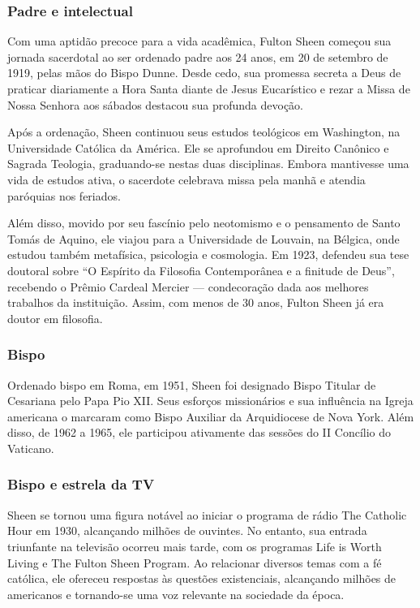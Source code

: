 \documentclass[11pt]{article}
\begin{document}
\begin{justify}
\subsubsection{Padre e intelectual}

Com uma aptidão precoce para a vida acadêmica, Fulton Sheen começou sua jornada sacerdotal ao ser ordenado padre aos 24 anos, em 20 de setembro de 1919, pelas mãos do Bispo Dunne. Desde cedo, sua promessa secreta a Deus de praticar diariamente a Hora Santa diante de Jesus Eucarístico e rezar a Missa de Nossa Senhora aos sábados destacou sua profunda devoção.

Após a ordenação, Sheen continuou seus estudos teológicos em Washington, na Universidade Católica da América. Ele se aprofundou em Direito Canônico e Sagrada Teologia, graduando-se nestas duas disciplinas. Embora mantivesse uma vida de estudos ativa, o sacerdote celebrava missa pela manhã e atendia paróquias nos feriados.

Além disso, movido por seu fascínio pelo neotomismo e o pensamento de Santo Tomás de Aquino, ele viajou para a Universidade de Louvain, na Bélgica, onde estudou também metafísica, psicologia e cosmologia. Em 1923, defendeu sua tese doutoral sobre “O Espírito da Filosofia Contemporânea e a finitude de Deus”, recebendo o Prêmio Cardeal Mercier — condecoração dada aos melhores trabalhos da instituição. Assim, com menos de 30 anos, Fulton Sheen já era doutor em filosofia.

\subsubsection{Bispo}

Ordenado bispo em Roma, em 1951, Sheen foi designado Bispo Titular de Cesariana pelo Papa Pio XII. Seus esforços missionários e sua influência na Igreja americana o marcaram como Bispo Auxiliar da Arquidiocese de Nova York. Além disso, de 1962 a 1965, ele participou ativamente das sessões do II Concílio do Vaticano.

\subsubsection{Bispo e estrela da TV}

Sheen se tornou uma figura notável ao iniciar o programa de rádio The Catholic Hour em 1930, alcançando milhões de ouvintes. No entanto, sua entrada triunfante na televisão ocorreu mais tarde, com os programas Life is Worth Living e The Fulton Sheen Program. Ao relacionar diversos temas com a fé católica, ele ofereceu respostas às questões existenciais, alcançando milhões de americanos e tornando-se uma voz relevante na sociedade da época.


\end{justify}
\end{document}

